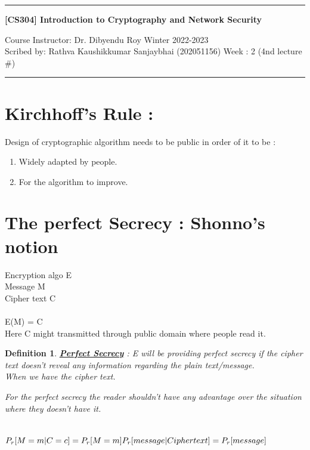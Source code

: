 \documentclass[11pt]{article}
\newtheorem{definition}{Definition}
\begin{document}

\noindent
\rule{\textwidth}{1pt}
\begin{center}
{\bf [CS304] Introduction to Cryptography and Network Security}
\end{center}
Course Instructor: Dr. Dibyendu Roy \hfill Winter 2022-2023\\
Scribed by: Rathva Kaushikkumar Sanjaybhai (202051156) \hfill Week : 2 (4nd lecture \#)
\\
\rule{\textwidth}{1pt}


\section{Kirchhoff's Rule :}
Design of cryptographic algorithm needs to be public in order of it to be :
\begin{enumerate}
    \item Widely adapted by people.
    \item For the algorithm to improve.
\end{enumerate}

\section{The perfect Secrecy : Shonno's notion}
Encryption algo \quad E\\ 
Message \quad M \\
Cipher text \quad C \\\\
E(M) = C\\
 Here C might transmitted through public domain where people read it.
\begin{definition}
\textbf{\underline{Perfect Secrecy}} : E will be providing perfect secrecy if the cipher text doesn't reveal any information regarding the plain text/message.\\
When we have the cipher text.

For the perfect secrecy the reader shouldn't have any advantage over the situation where they doesn't have it.
\end{definition}\\

$P_r[M=m | C=c]=P_r[M=m]\\

P_r[message | Cipher text] = P_r[message]$\\
\end{document}
